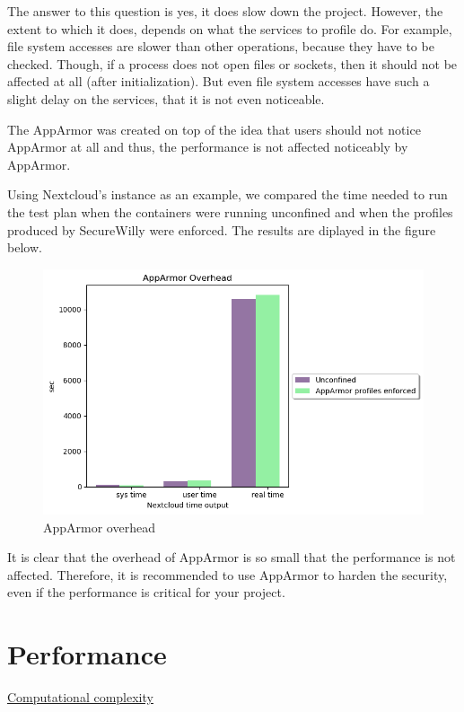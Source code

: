 The answer to this question is yes, it does slow down the project. However, the extent to which it does, depends on what the services to profile do. For example, file system accesses are slower than other operations, because they have to be checked. Though, if a process does not open files or sockets, then it should not be affected at all (after initialization). But even file system accesses have such a slight delay on the services, that it is not even noticeable.

The AppArmor was created on top of the idea that users should not notice AppArmor at all and thus, the performance is not affected noticeably by AppArmor.

Using Nextcloud's instance as an example, we compared the time needed to run the test plan when the containers were running unconfined and when the profiles produced by SecureWilly were enforced. The results are diplayed in the figure below.

\begin{figure}[h!]
  \centering
   \includegraphics[width=1\linewidth]{../figures/overhead.png}
   \caption{AppArmor overhead}
\end{figure}

It is clear that the overhead of AppArmor is so small that the performance is not affected. Therefore, it is recommended to use AppArmor to harden the security, even if the performance is critical for your project.

\clearpage
\section{Performance}

\underline{Computational complexity}
\hfill\break

